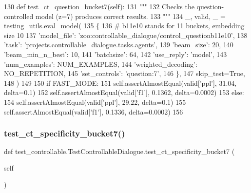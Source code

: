 \begin{DoxyCode}
130     \textcolor{keyword}{def }test\_ct\_question\_bucket7(self):
131         \textcolor{stringliteral}{"""}
132 \textcolor{stringliteral}{        Checks the question-controlled model (z=7) produces correct results.}
133 \textcolor{stringliteral}{        """}
134         \_, valid, \_ = testing\_utils.eval\_model(
135             \{
136                 \textcolor{comment}{# b11e10 stands for 11 buckets, embedding size 10}
137                 \textcolor{stringliteral}{'model\_file'}: \textcolor{stringliteral}{'zoo:controllable\_dialogue/control\_questionb11e10'},
138                 \textcolor{stringliteral}{'task'}: \textcolor{stringliteral}{'projects.controllable\_dialogue.tasks.agents'},
139                 \textcolor{stringliteral}{'beam\_size'}: 20,
140                 \textcolor{stringliteral}{'beam\_min\_n\_best'}: 10,
141                 \textcolor{stringliteral}{'batchsize'}: 64,
142                 \textcolor{stringliteral}{'use\_reply'}: \textcolor{stringliteral}{'model'},
143                 \textcolor{stringliteral}{'num\_examples'}: NUM\_EXAMPLES,
144                 \textcolor{stringliteral}{'weighted\_decoding'}: NO\_REPETITION,
145                 \textcolor{stringliteral}{'set\_controls'}: \textcolor{stringliteral}{'question:7'},
146             \},
147             skip\_test=\textcolor{keyword}{True},
148         )
149 
150         \textcolor{keywordflow}{if} FAST\_MODE:
151             self.assertAlmostEqual(valid[\textcolor{stringliteral}{'ppl'}], 31.04, delta=0.1)
152             self.assertAlmostEqual(valid[\textcolor{stringliteral}{'f1'}], 0.1362, delta=0.0002)
153         \textcolor{keywordflow}{else}:
154             self.assertAlmostEqual(valid[\textcolor{stringliteral}{'ppl'}], 29.22, delta=0.1)
155             self.assertAlmostEqual(valid[\textcolor{stringliteral}{'f1'}], 0.1336, delta=0.0002)
156 
\end{DoxyCode}
\mbox{\label{classtest__controllable_1_1TestControllableDialogue_a1cf543f3400075fe15ae7eea6b51156c}} 
\subsubsection{\texorpdfstring{test\+\_\+ct\+\_\+specificity\+\_\+bucket7()}{test\_ct\_specificity\_bucket7()}}
{\footnotesize\ttfamily def test\+\_\+controllable.\+Test\+Controllable\+Dialogue.\+test\+\_\+ct\+\_\+specificity\+\_\+bucket7 (\begin{DoxyParamCaption}\item[{}]{self }\end{DoxyParamCaption})}

